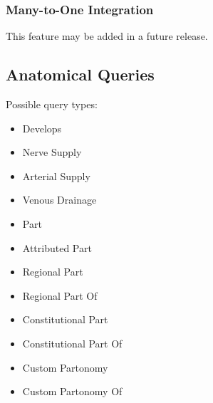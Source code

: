 \documentclass{article}
\begin{document}
\subsubsection{Many-to-One Integration}
This feature may be added in a future release.
\subsection{Anatomical Queries}
Possible query types:
\begin{itemize}
\item Develops
\item Nerve Supply
\item Arterial Supply
\item Venous Drainage
\item Part
\item Attributed Part
\item Regional Part
\item Regional Part Of
\item Constitutional Part
\item Constitutional Part Of
\item Custom Partonomy
\item Custom Partonomy Of
\end{itemize}
\end{document}
